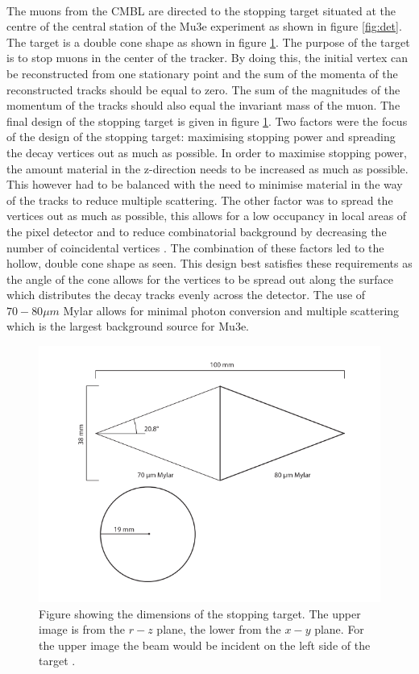 \paragraph{}
 The muons from the CMBL are directed to the stopping target situated at the centre of the central station of the Mu3e experiment as shown in figure \ref{fig:det}. The target is a double cone shape as shown in figure \ref{fig:stop}. The purpose of the target is to stop muons in the center of the tracker. By doing this, the initial vertex can be reconstructed from one stationary point and the sum of the momenta of the reconstructed tracks should be equal to zero. The sum of the magnitudes of the momentum of the tracks should also equal the invariant mass of the muon. The final design of the stopping target is given in figure \ref{fig:stop}. Two factors were the focus of the design of the stopping target: maximising stopping power and spreading the decay vertices out as much as possible. In order to maximise stopping power, the amount material in the z-direction needs to be increased as much as possible. This however had to be balanced with the need to minimise material in the way of the tracks to reduce multiple scattering. The other factor was to spread the vertices out as much as possible, this allows for a low occupancy in local areas of the pixel detector and to reduce combinatorial background by decreasing the number of coincidental vertices \cite{Arndt}. The combination of these factors led to the hollow, double cone shape as seen. This design best satisfies these requirements as the angle of the cone allows for the vertices to be spread out along the surface which distributes the decay tracks evenly across the detector. The use of $70-80\mu m$ Mylar allows for minimal photon conversion and multiple scattering which is the largest background source for Mu3e.

\begin{figure}
    \centering
    \includegraphics[width=\textwidth]{fig/setup/stop.PNG}
    \caption{Figure showing the dimensions of the stopping target. The upper image is from the $r-z$ plane, the lower from the $x-y$ plane. For the upper image the beam would be incident on the left side of the target \cite{Calibbi}.}
    \label{fig:stop}
\end{figure}

